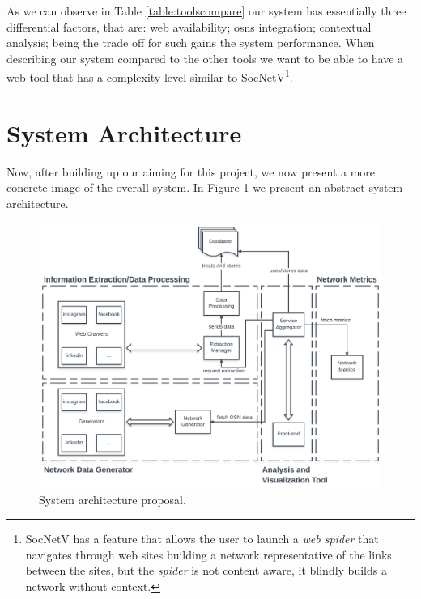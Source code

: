 As we can observe in Table \ref{table:toolscompare} our system has essentially three differential factors, that are: web availability; \glspl{osn} integration; contextual analysis; being the trade off for such gains the system performance. When describing our system compared to the other tools we want to be able to have a web tool that has a complexity level similar to SocNetV\footnote{\label{socnetv-footnote}SocNetV has a feature that allows the user to launch a \textit{web spider} that navigates through web sites building a network representative of the links between the sites, but the \textit{spider} is not content aware, it blindly builds a network without context.}.

\section{System Architecture}

Now, after building up our aiming for this project, we now present a more concrete image of the overall system. In Figure \ref{img:architectureprop} we present an abstract system architecture.

\begin{figure}[h!]
\begin{center}
  \hspace*{-0.8in}
  \includegraphics[width=1.2\textwidth]{img/architecture_v4.png}
\end{center}
\caption{\label{img:architectureprop} System architecture proposal.}
\end{figure}

